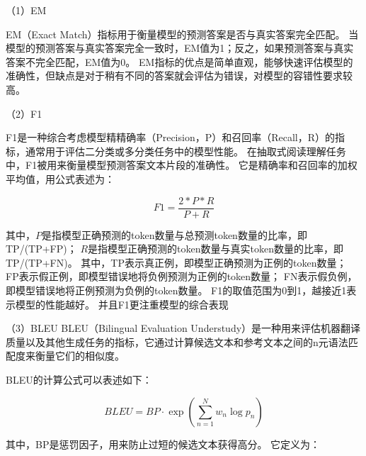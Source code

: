 （1）EM

EM（Exact Match）指标用于衡量模型的预测答案是否与真实答案完全匹配。
当模型的预测答案与真实答案完全一致时，EM值为1；反之，如果预测答案与真实答案不完全匹配，EM值为0。
EM指标的优点是简单直观，能够快速评估模型的准确性，但缺点是对于稍有不同的答案就会评估为错误，对模型的容错性要求较高。

（2）F1

F1是一种综合考虑模型精精确率（Precision，P）和召回率（Recall，R）的指标，通常用于评估二分类或多分类任务中的模型性能。
在抽取式阅读理解任务中，F1被用来衡量模型预测答案文本片段的准确性。
它是精确率和召回率的加权平均值，用公式表述为：

$$F1=\frac{2*P*R}{P+R}$$

其中，$P$是指模型正确预测的token数量与总预测token数量的比率，即TP/(TP+FP)；
$R$是指模型正确预测的token数量与真实token数量的比率，即TP/(TP+FN)。
其中，TP表示真正例，即模型正确预测为正例的token数量；
FP表示假正例，即模型错误地将负例预测为正例的token数量；
FN表示假负例，即模型错误地将正例预测为负例的token数量。
F1的取值范围为0到1，越接近1表示模型的性能越好。
并且F1更注重模型的综合表现


（3）BLEU
BLEU（Bilingual Evaluation Understudy）是一种用来评估机器翻译质量以及其他生成任务的指标，它通过计算候选文本和参考文本之间的n元语法匹配度来衡量它们的相似度。


BLEU的计算公式可以表述如下：

$$BLEU = BP \cdot \exp \left( \sum_{n=1}^{N} w_n \log p_n \right)$$

其中，BP是惩罚因子，用来防止过短的候选文本获得高分。
它定义为：

